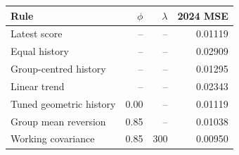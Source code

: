 \begin{tabular}{lrrr}
\toprule
Rule & $\phi$ & $\lambda$ & 2024 MSE \\
\midrule
Latest score & -- & -- & 0.01119 \\
Equal history & -- & -- & 0.02909 \\
Group-centred history & -- & -- & 0.01295 \\
Linear trend & -- & -- & 0.02343 \\
Tuned geometric history & 0.00 & -- & 0.01119 \\
Group mean reversion & 0.85 & -- & 0.01038 \\
Working covariance & 0.85 & 300 & 0.00950 \\
\bottomrule
\end{tabular}
